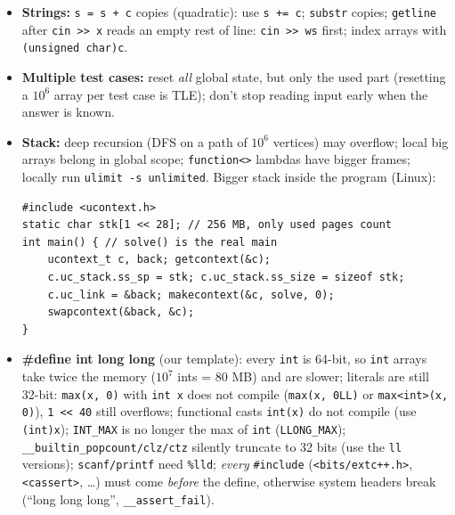 \begin{itemize}
		\texttt{lower\_bound(s.begin(), s.end(), x)} on a set is $O(n)$, use \texttt{s.lower\_bound(x)};
		\texttt{m[key]} inserts a default value, use \texttt{count/find} to test;
		erase while iterating: \texttt{it = s.erase(it)}; \texttt{multiset::erase(x)} removes \emph{all}
		copies, use \texttt{erase(find(x))}; \texttt{priority\_queue} is a max-heap
		(\texttt{greater<>} for min); \texttt{vector<bool>} elements are proxies;
		\texttt{next\_permutation} needs a sorted start; \texttt{unordered\_map} can be hacked/slow: HashMap.
	\item \textbf{Strings:} \texttt{s = s + c} copies (quadratic): use \texttt{s += c}; \texttt{substr} copies;
		\texttt{getline} after \texttt{cin >{}> x} reads an empty rest of line: \texttt{cin >{}> ws} first;
		index arrays with \texttt{(unsigned char)c}.
	\item \textbf{Multiple test cases:} reset \emph{all} global state, but only the used part (resetting a $10^6$
		array per test case is TLE); don't stop reading input early when the answer is known.
	\item \textbf{Stack:} deep recursion (DFS on a path of $10^6$ vertices) may overflow; local big arrays
		belong in global scope; \texttt{function<>} lambdas have bigger frames; locally run
		\texttt{ulimit -s unlimited}. Bigger stack inside the program (Linux):
\begin{lstlisting}
#include <ucontext.h>
static char stk[1 << 28]; // 256 MB, only used pages count
int main() { // solve() is the real main
	ucontext_t c, back; getcontext(&c);
	c.uc_stack.ss_sp = stk; c.uc_stack.ss_size = sizeof stk;
	c.uc_link = &back; makecontext(&c, solve, 0);
	swapcontext(&back, &c);
}
\end{lstlisting}
	\item \textbf{\#define int long long} (our template): every \texttt{int} is 64-bit, so \texttt{int}
		arrays take twice the memory ($10^7$ ints = 80 MB) and are slower; literals are still 32-bit:
		\texttt{max(x, 0)} with \texttt{int x} does not compile (\texttt{max(x, 0LL)} or
		\texttt{max<int>(x, 0)}), \texttt{1 <{}< 40} still overflows; functional casts \texttt{int(x)} do not
		compile (use \texttt{(int)x}); \texttt{INT\_MAX} is no longer the max of \texttt{int}
		(\texttt{LLONG\_MAX}); \texttt{\_\_builtin\_popcount/clz/ctz} silently truncate to 32 bits (use the
		\texttt{ll} versions); \texttt{scanf/printf} need \texttt{\%lld}; \emph{every} \texttt{\#include}
		(\texttt{<bits/extc++.h>}, \texttt{<cassert>}, \dots) must come \emph{before} the define,
		otherwise system headers break (``long long long'', \texttt{\_\_assert\_fail}).

\end{itemize}
